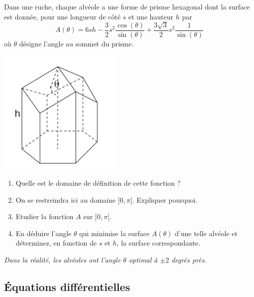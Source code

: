 \begin{exo}
Dans une ruche, chaque alv\'eole a une forme de prisme hexagonal dont la surface est donn\'ee, pour une longueur de c\^ot\'e
\(s\) et une hauteur \(h\) par 
\[A(\theta) = 6sh - \frac{3}{2}s^{2}\frac{\cos(\theta)}{\sin(\theta)}+\frac{3\sqrt{3}}{2}s^{2}\frac{1}{\sin(\theta)}\]
o\`u \(\theta\) d\'esigne l'angle au sommet du prisme.
\begin{center}
\includegraphics[width=6cm]{drawings/abeille.pdf}
\end{center}
\begin{enumerate}
\item Quelle est le domaine de d\'efinition de cette fonction ? 
\item On se restreindra ici au domaine $]0,\pi[$. Expliquer pourquoi. 
\item  Etudier la fonction $A$ sur $]0,\pi[$. 
\item En d\'eduire l'angle \(\theta\) qui minimise la surface $A(\theta)$ d'une telle alv\'eole et d\'eterminez, en fonction de \(s\) et \(h\), la surface correspondante.
\end{enumerate}

\textit{Dans la réalité, les alvéoles ont l'angle $\theta$ optimal à $\pm 2$ degrés près.}
\end{exo}


\subsection{Équations différentielles}

